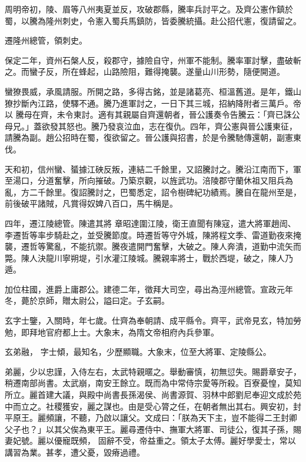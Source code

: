 \begin{pinyinscope}
 周明帝初，陵、眉等八州夷夏並反，攻破郡縣，騰率兵討平之。及齊公憲作鎮於蜀，以騰為隆州刺史，令憲入蜀兵馬鎮防，皆委騰統攝。赴公招代憲，復請留之。



 遷隆州總管，領刺史。



 保定二年，資州石槃人反，殺郡守，據險自守，州軍不能制。騰率軍討擊，盡破斬之。而蠻子反，所在蜂起，山路險阻，難得掩襲。遂量山川形勢，隨便開道。



 蠻獠畏威，承風請服。所開之路，多得古銘，並是諸葛亮、桓溫舊道。是年，鐵山獠抄斷內江路，使驛不通。騰乃進軍討之，一日下其三城，招納降附者三萬戶。帝以
 騰母在齊，未令東討。適有其親屬自齊還朝者，晉公護奏令告騰云：「齊已誅公母兄。」蓋欲發其怒也。騰乃發哀泣血，志在復仇。四年，齊公憲與晉公護東征，請騰為副。趙公招時在蜀，復欲留之。晉公護與招書，於是令騰馳傳還朝，副憲東伐。



 天和初，信州蠻、蜑據江硤反叛，連結二千餘里，又詔騰討之。騰沿江南而下，軍至湯口，分道奮擊，所向摧破。乃築京觀，以旌武功。涪陵郡守蘭休祖又阻兵為亂，方二千餘里。復詔騰討之，巴蜀悉定，詔令樹碑紀功績焉。騰自在龍州至是，前後破平諸賊，凡賞得奴婢八百口，馬牛稱是。



 四年，遷江陵總管。陳遣其將
 章昭達圍江陵，衛王直聞有陳寇，遣大將軍趙訚、李遷哲等率步騎赴之，並受騰節度。時遷哲等守外城，陳將程文季、雷道勤夜來掩襲，遷哲等驚亂，不能抗禦。騰夜遣開門奮擊，大破之。陳人奔潰，道勤中流矢而斃。陳人決龍川寧朔堤，引水灌江陵城。騰親率將士，戰於西堤，破之，陳人乃遁。



 加位柱國，進爵上庸郡公。建德二年，徵拜大司空，尋出為涇州總管。宣政元年冬，薨於京師，贈太尉公，謚曰定。子玄嗣。



 玄字士鑒，入關時，年七歲。仕齊為奉朝請、成平縣令。齊平，武帝見玄，特加勞勉，即拜地官府都上士。大象末，為隋文帝相府內兵參軍。



 玄弟融，
 字士傾，最知名，少歷顯職。大象末，位至大將軍、定陵縣公。



 弟麗，少以忠謹，入侍左右，太武特親暱之。舉動審慎，初無愆失。賜爵章安子，稍遷南部尚書。太武崩，南安王餘立。既而為中常侍宗愛等所殺。百寮憂惶，莫知所立。麗首建大議，與殿中尚書長孫渴侯、尚書源賀、羽林中郎劉尼奉迎文成於苑中而立之。社稷獲安，麗之謀也。由是受心膂之任，在朝者無出其右。興安初，封平原王。麗頻讓，不聽，乃啟以讓父。文成曰：「朕為天下主，豈不能得二王封卿父子也？」以其父俟為東平王。麗尋遷侍中、撫軍大將軍、司徒公，復其子孫，賜妻妃號。麗以優寵既頻，
 固辭不受，帝益重之。領太子太傅。麗好學愛士，常以講習為業。甚孝，遭父憂，毀瘠過禮。




\end{pinyinscope}

